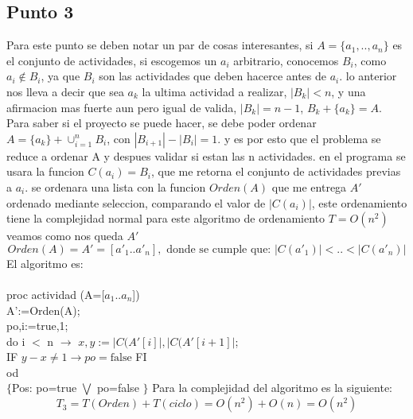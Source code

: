 \documentclass{article}
\newcommand\tab[1][1cm]{\hspace*{#1}}
\begin{document}
\subsection*{Punto 3}
Para este punto se deben notar un par de cosas interesantes, si $A=\{a_1,..,a_n\}$ es el conjunto de actividades, si escogemos un $a_i$ arbitrario, conocemos $B_i$, como $a_i \notin B_i$, ya que $B_i$ son las actividades que deben hacerce antes de $a_i$.
lo anterior nos lleva a decir que sea $a_k$ la ultima actividad a realizar, $|B_k|<n$, y una afirmacion mas fuerte aun pero igual de valida, $|B_k|=n-1$, $B_k+\{a_k\}=A$.
Para saber si el proyecto se puede hacer, se debe poder ordenar $A=\{a_k\}+\cup_{i=1}^{n} B_i$, con $|B_{i+1}|-|B_i|=1$. y es por esto que el problema se reduce a ordenar A y despues validar si estan las n actividades.
en el programa se usara la funcion $C(a_i)=B_i$, que me retorna el conjunto de actividades previas a $a_i$.
se ordenara una lista con la funcion $Orden(A)$ que me entrega $A'$ ordenado mediante seleccion, comparando el valor de $|C(a_i)|$, este ordenamiento tiene la complejidad normal para este algoritmo de ordenamiento $T=O(n^2)$
veamos como nos queda $A'$
\begin{equation}
Orden(A)=A'=[a'_1..a'_n], \text{ donde se cumple que: } |C(a'_1)|<..<|C(a'_n)|
\end{equation}
El algoritmo es:
\\\\
proc actividad (A=[$a_1..a_n$])  \\
A':=Orden(A);\\
po,i:=true,1;\\
do i $<$ n $\rightarrow$ $x,y:=|C(A'[i]|,|C(A'[i+1]|$;\\
\tab \tab IF $y-x\neq 1 \rightarrow po=\text{false }$FI\\
od\\
$\{$Pos: po=true $\bigvee$ po=false $\}$
Para la complejidad del algoritmo es la siguiente:
\begin{equation}
T_3=T(Orden)+T(ciclo)=O(n^2)+O(n)=O(n^2)
\end{equation}
\end{document}
